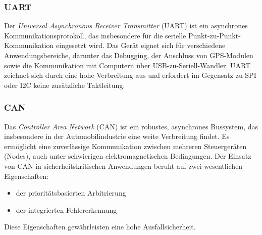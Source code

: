 \subsubsection*{UART}
Der \emph{Universal Asynchronous Receiver Transmitter} (UART) ist ein asynchrones Kommunikationsprotokoll, das insbesondere für die serielle Punkt-zu-Punkt-Kommunikation eingesetzt wird. 
Das Gerät eignet sich für verschiedene Anwendungsbereiche, darunter das Debugging, der Anschluss von GPS-Modulen sowie die Kommunikation mit Computern über USB-zu-Seriell-Wandler. 
UART zeichnet sich durch eine hohe Verbreitung aus und erfordert im Gegensatz zu SPI oder I2C keine zusätzliche Taktleitung.

\subsubsection*{CAN}
Das \emph{Controller Area Network} (CAN) ist ein robustes, asynchrones Bussystem, das insbesondere in der Automobilindustrie eine weite Verbreitung findet. 
Es ermöglicht eine zuverlässige Kommunikation zwischen mehreren Steuergeräten (Nodes), auch unter schwierigen elektromagnetischen Bedingungen. 
Der Einsatz von CAN in sicherheitskritischen Anwendungen beruht auf zwei wesentlichen Eigenschaften: 
\begin{itemize}
	\item der prioritätsbasierten Arbitrierung
	\item der integrierten Fehlererkennung
\end{itemize}
 
 Diese Eigenschaften gewährleisten eine hohe Ausfallsicherheit.

%
%
%

